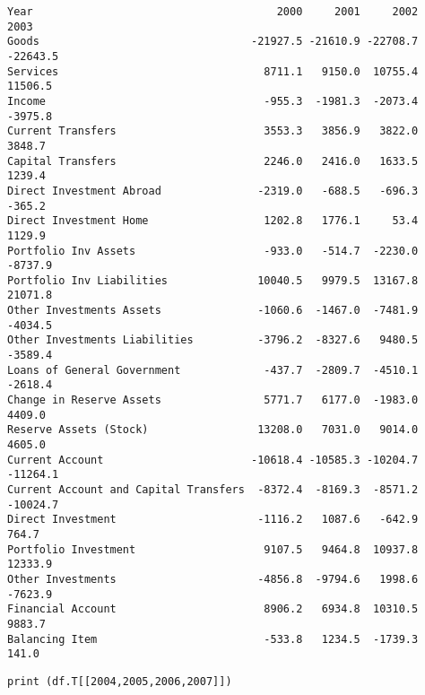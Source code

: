 \documentclass[12pt,fleqn]{article}\usepackage{../../common}
\begin{document}
\begin{verbatim}
Year                                      2000     2001     2002     2003
Goods                                 -21927.5 -21610.9 -22708.7 -22643.5
Services                                8711.1   9150.0  10755.4  11506.5
Income                                  -955.3  -1981.3  -2073.4  -3975.8
Current Transfers                       3553.3   3856.9   3822.0   3848.7
Capital Transfers                       2246.0   2416.0   1633.5   1239.4
Direct Investment Abroad               -2319.0   -688.5   -696.3   -365.2
Direct Investment Home                  1202.8   1776.1     53.4   1129.9
Portfolio Inv Assets                    -933.0   -514.7  -2230.0  -8737.9
Portfolio Inv Liabilities              10040.5   9979.5  13167.8  21071.8
Other Investments Assets               -1060.6  -1467.0  -7481.9  -4034.5
Other Investments Liabilities          -3796.2  -8327.6   9480.5  -3589.4
Loans of General Government             -437.7  -2809.7  -4510.1  -2618.4
Change in Reserve Assets                5771.7   6177.0  -1983.0   4409.0
Reserve Assets (Stock)                 13208.0   7031.0   9014.0   4605.0
Current Account                       -10618.4 -10585.3 -10204.7 -11264.1
Current Account and Capital Transfers  -8372.4  -8169.3  -8571.2 -10024.7
Direct Investment                      -1116.2   1087.6   -642.9    764.7
Portfolio Investment                    9107.5   9464.8  10937.8  12333.9
Other Investments                      -4856.8  -9794.6   1998.6  -7623.9
Financial Account                       8906.2   6934.8  10310.5   9883.7
Balancing Item                          -533.8   1234.5  -1739.3    141.0
\end{verbatim}

\begin{verbatim}
print (df.T[[2004,2005,2006,2007]])
\end{verbatim}
\end{document}
